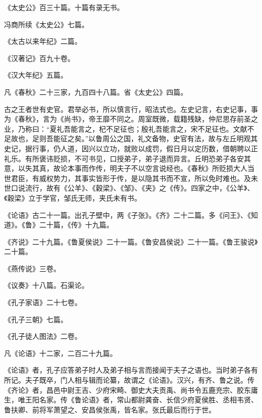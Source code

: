 \documentclass[12pt,UTF8]{ctexbook}
\begin{document}
《太史公》百三十篇。十篇有录无书。



冯商所续《太史公》七篇。



《太古以来年纪》二篇。



《汉著记》百九十卷。



《汉大年纪》五篇。



凡《春秋》二十三家，九百四十八篇。省《太史公》四篇。



古之王者世有史官。君举必书，所以慎言行，昭法式也。左史记言，右史记事，事为《春秋》，言为《尚书》，帝王靡不同之。周室既微，载籍残缺，仲尼思存前圣之业，乃称曰：“夏礼吾能言之，杞不足征也；殷礼吾能言之，宋不足征也。文献不足故也，足则吾能征之矣。”以鲁周公之国，礼文备物，史官有法，故与左丘明观其史记，据行事，仍人道，因兴以立功，就败以成罚，假日月以定历数，借朝聘以正礼乐。有所褒讳贬损，不可书见，口授弟子，弟子退而异言。丘明恐弟子各安其意，以失其真，故论本事而作传，明夫子不以空言说经也。《春秋》所贬损大人当世君臣，有威权势力，其事实皆形于传，是以隐其书而不宣，所以免时难也。及未世口说流行，故有《公羊》、《穀梁》、《邹》、《夹》之《传》。四家之中，《公羊》、《穀梁》立于学官，邹氏无师，夹氏未有书。



《论语》古二十一篇。出孔子壁中，两《子张》。《齐》二十二篇。多《问王》、《知道》。《鲁》二十篇，《传》十九篇。



《齐说》二十九篇。《鲁夏侯说》二十一篇。《鲁安昌侯说》二十一篇。《鲁王骏说》二十篇。



《燕传说》三卷。



《议奏》十八篇。石渠论。



《孔子家语》二十七卷。



《孔子三朝》七篇。



《孔子徒人图法》二卷。



凡《论语》十二家，二百二十九篇。



《论语》者，孔子应答弟子时人及弟子相与言而接闻于夫子之语也。当时弟子各有所记。夫子既卒，门人相与辑而论纂，故谓之《论语》。汉兴，有齐、鲁之说。传《齐论》者，昌邑中尉王吉、少府宋畸、御史大夫贡禹、尚书令五鹿充宗、胶东庸生，唯王阳名家。传《鲁论语》者，常山都尉龚奋、长信少府夏侯胜、丞相韦贤、鲁扶卿、前将军萧望之、安昌侯张禹，皆名家。张氏最后而行于世。
\end{document}
